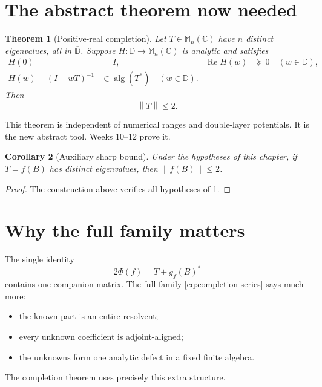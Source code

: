 \documentclass[11pt,oneside,openany]{book}
\newtheorem{theorem}{Theorem}[chapter]
\newtheorem{corollary}[theorem]{Corollary}
\theoremstyle{definition}
\theoremstyle{remark}
\newcommand{\C}{\mathbb C}
\newcommand{\D}{\mathbb D}
\newcommand{\Mn}{\mathbb M_n(\C)}
\newcommand{\alg}{\operatorname{alg}}
\newcommand{\RePart}{\operatorname{Re}}
\newcommand{\norm}[1]{\left\lVert #1\right\rVert}
\newcommand{\olD}{\overline{\D}}
\begin{document}
\section{The abstract theorem now needed}

\begin{theorem}[Positive-real completion]
\label{thm:completion}
Let \(T\in\Mn\) have \(n\) distinct eigenvalues, all in \(\olD\).
Suppose \(H:\D\to\Mn\) is analytic and satisfies
\begin{align}
  H(0)&=I,
  &
  \RePart H(w)&\succeq0
  \quad(w\in\D),
  \label{eq:completion-positive}\\
  H(w)-(I-wT)^{-1}&\in\alg(T^*)
  \quad(w\in\D).
  \label{eq:completion-algebra}
\end{align}
Then
\[
  \norm{T}\leq2.
\]
\end{theorem}

This theorem is independent of numerical ranges and double-layer
potentials.  It is the new abstract tool.  Weeks 10--12 prove it.

\begin{corollary}[Auxiliary sharp bound]
\label{cor:auxiliary}
Under the hypotheses of this chapter, if \(T=f(B)\) has distinct
eigenvalues, then \(\norm{f(B)}\leq2\).
\end{corollary}

\begin{proof}
The construction above verifies all hypotheses of
\cref{thm:completion}.
\end{proof}

\section{Why the full family matters}

The single identity
\[
  2\Phi(f)=T+g_f(B)^*
\]
contains one companion matrix.  The full family
\eqref{eq:completion-series} says much more:
\begin{itemize}
  \item the known part is an entire resolvent;
  \item every unknown coefficient is adjoint-aligned;
  \item the unknowns form one analytic defect in a fixed finite
  algebra.
\end{itemize}
The completion theorem uses precisely this extra structure.
\end{document}

